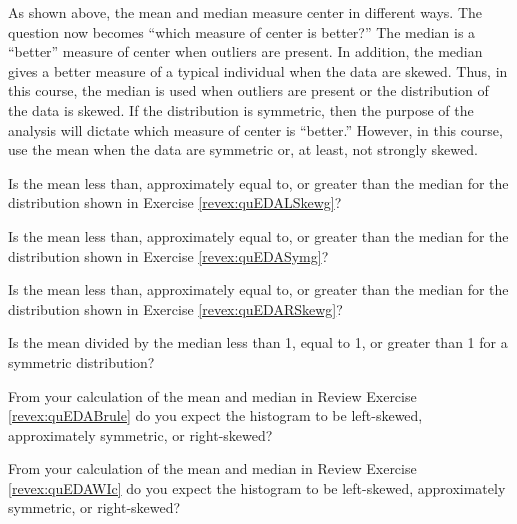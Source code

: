 \documentclass[10pt,openany]{book}\usepackage[]{graphicx}\usepackage[]{color}
\begin{document}
As shown above, the mean and median measure center in different ways.  The question now becomes ``which measure of center is better?''  The median is a ``better'' measure of center when outliers are present.  In addition, the median gives a better measure of a typical individual when the data are skewed.  Thus, in this course, the median is used when outliers are present or the distribution of the data is skewed.  If the distribution is symmetric, then the purpose of the analysis will dictate which measure of center is ``better.''  However, in this course, use the mean when the data are symmetric or, at least, not strongly skewed.


\vspace{-12pt}
\begin{exsection}
  \item \label{revex:quEDALSkewMM}Is the mean less than, approximately equal to, or greater than the median for the distribution shown in Exercise \ref{revex:quEDALSkewg}? 
  \item \label{revex:quEDAAsymMM}Is the mean less than, approximately equal to, or greater than the median for the distribution shown in Exercise \ref{revex:quEDASymg}? 
  \item \label{revex:quEDARSkewMM}Is the mean less than, approximately equal to, or greater than the median for the distribution shown in Exercise \ref{revex:quEDARSkewg}? 
  \item \label{revex:quEDARatio} Is the mean divided by the median less than 1, equal to 1, or greater than 1 for a symmetric distribution? 
  \item \label{revex:quEDABruleMM} From your calculation of the mean and median in Review Exercise  \ref{revex:quEDABrule} do you expect the histogram to be left-skewed, approximately symmetric, or right-skewed? 
  \item \label{revex:quEDAWIcMM} From your calculation of the mean and median in Review Exercise \ref{revex:quEDAWIc} do you expect the histogram to be left-skewed, approximately symmetric, or right-skewed? 
\end{exsection}
\end{document}

